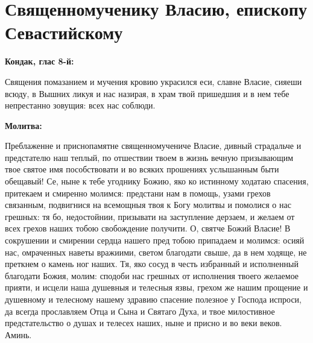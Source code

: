 
 

\section{Священномученику Власию, епископу Севастийскому}
 


\bfseries Кондак, глас 8-й:\normalfont{}


Священия помазанием и мучения кровию украсился еси, славне Власие, сияеши всюду, в Вышних ликуя и нас назирая, в храм твой пришедшия и в нем тебе непрестанно зовущия: всех нас соблюди.


\medskip


\bfseries Молитва:\normalfont{}


Преблаженне и приснопамятне священномучениче Власие, дивный страдальче и предстателю наш теплый, по отшествии твоем в жизнь вечную призывающим твое святое имя пособствовати и во всяких прошениях услышанным быти обещавый! Се, ныне к тебе угоднику Божию, яко ко истинному ходатаю спасения, притекаем и смиренно молимся: предстани нам в помощь, узами грехов связанным, подвигнися на всемощныя твоя к Богу молитвы и помолися о нас грешных: тя бо, недостойнии, призывати на заступление дерзаем, и желаем от всех грехов наших тобою свобождение получити. О, святче Божий Власие! В сокрушении и смирении сердца нашего пред тобою припадаем и молимся: осияй нас, омраченных наветы вражиими, светом благодати свыше, да в нем ходяще, не преткнем о камень ног наших. Тя, яко сосуд в честь избранный и исполненный благодати Божия, молим: сподоби нас грешных от исполнения твоего желаемое прияти, и исцели наша душевныя и телесныя язвы, грехом же нашим прощение и душевному и телесному нашему здравию спасение полезное у Господа испроси, да всегда прославляем Отца и Сына и Святаго Духа, и твое милостивное предстательство о душах и телесех наших, ныне и присно и во веки веков. Аминь.
